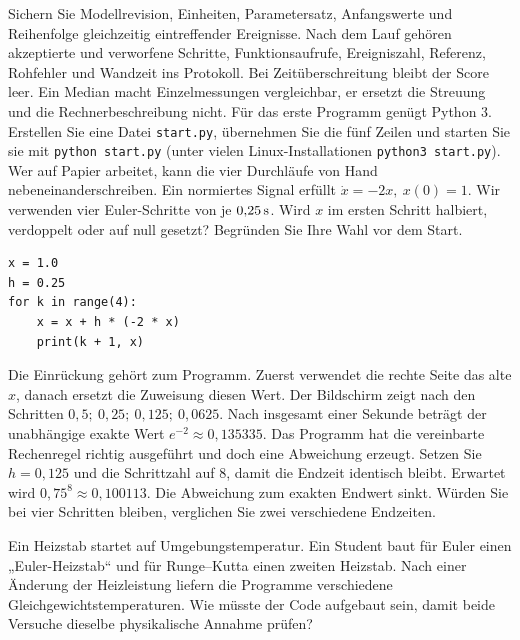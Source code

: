Sichern Sie Modellrevision, Einheiten, Parametersatz, Anfangswerte und Reihenfolge gleichzeitig eintreffender Ereignisse. Nach dem Lauf gehören akzeptierte und verworfene Schritte, Funktionsaufrufe, Ereigniszahl, Referenz, Rohfehler und Wandzeit ins Protokoll. Bei Zeitüberschreitung bleibt der Score leer. Ein Median macht Einzelmessungen vergleichbar, er ersetzt die Streuung und die Rechnerbeschreibung nicht.
\clearpage{}
Für das erste Programm genügt Python 3. Erstellen Sie eine Datei \texttt{start.py}, übernehmen Sie die fünf Zeilen und starten Sie sie mit \texttt{python start.py} (unter vielen Linux-Installationen \texttt{python3 start.py}). Wer auf Papier arbeitet, kann die vier Durchläufe von Hand nebeneinanderschreiben.
Ein normiertes Signal erfüllt \(\dot x=-2x,\ x(0)=1\). Wir verwenden vier Euler-Schritte von je \(0{,}25\,\mathrm{s}\). Wird \(x\) im ersten Schritt halbiert, verdoppelt oder auf null gesetzt? Begründen Sie Ihre Wahl vor dem Start.
{\small\begin{verbatim}
x = 1.0
h = 0.25
for k in range(4):
    x = x + h * (-2 * x)
    print(k + 1, x)
\end{verbatim}}
Die Einrückung gehört zum Programm. Zuerst verwendet die rechte Seite das alte \(x\), danach ersetzt die Zuweisung diesen Wert. Der Bildschirm zeigt nach den Schritten \(0{,}5;\ 0{,}25;\ 0{,}125;\ 0{,}0625\). Nach insgesamt einer Sekunde beträgt der unabhängige exakte Wert \(e^{-2}\approx0{,}135335\). Das Programm hat die vereinbarte Rechenregel richtig ausgeführt und doch eine Abweichung erzeugt.
Setzen Sie \(h=0{,}125\) und die Schrittzahl auf 8, damit die Endzeit identisch bleibt. Erwartet wird \(0{,}75^8\approx0{,}100113\). Die Abweichung zum exakten Endwert sinkt. Würden Sie bei vier Schritten bleiben, verglichen Sie zwei verschiedene Endzeiten.


Ein Heizstab startet auf Umgebungstemperatur. Ein Student baut für Euler einen „Euler-Heizstab“ und für Runge--Kutta einen zweiten Heizstab. Nach einer Änderung der Heizleistung liefern die Programme verschiedene Gleichgewichtstemperaturen. Wie müsste der Code aufgebaut sein, damit beide Versuche dieselbe physikalische Annahme prüfen?


